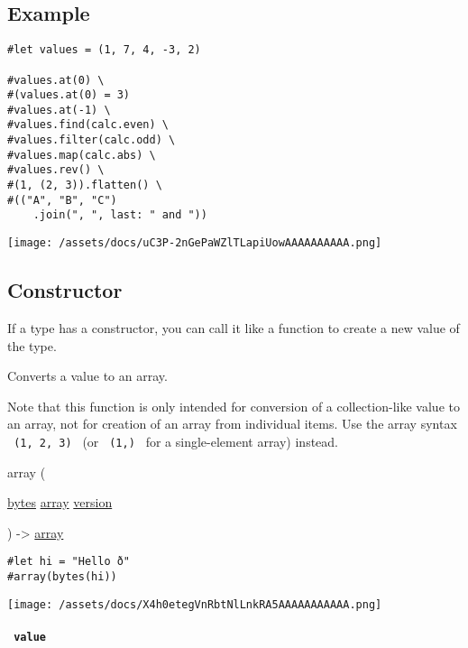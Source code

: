 \subsection{Example}\label{example}

\begin{verbatim}
#let values = (1, 7, 4, -3, 2)

#values.at(0) \
#(values.at(0) = 3)
#values.at(-1) \
#values.find(calc.even) \
#values.filter(calc.odd) \
#values.map(calc.abs) \
#values.rev() \
#(1, (2, 3)).flatten() \
#(("A", "B", "C")
    .join(", ", last: " and "))
\end{verbatim}

\texttt{[image: /assets/docs/uC3P-2nGePaWZlTLapiUowAAAAAAAAAA.png]}

\subsection{\texorpdfstring{Constructor
{}}{Constructor }}\label{constructor}

\phantomsection\label{constructor-constructor-tooltip}
If a type has a constructor, you can call it like a function to create a
new value of the type.

Converts a value to an array.

Note that this function is only intended for conversion of a
collection-like value to an array, not for creation of an array from
individual items. Use the array syntax \texttt{\ (1,\ 2,\ 3)\ } (or
\texttt{\ (1,)\ } for a single-element array) instead.

{ array } (

{ \href{/docs/reference/foundations/bytes/}{bytes}
\href{/docs/reference/foundations/array/}{array}
\href{/docs/reference/foundations/version/}{version} }

) -\textgreater{} \href{/docs/reference/foundations/array/}{array}

\begin{verbatim}
#let hi = "Hello ð"
#array(bytes(hi))
\end{verbatim}

\texttt{[image: /assets/docs/X4h0etegVnRbtNlLnkRA5AAAAAAAAAAA.png]}

\paragraph{\texorpdfstring{\texttt{\ value\ }}{ value }}\label{constructor-value}

